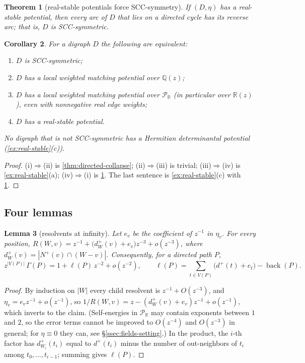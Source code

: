 \documentclass[11pt]{amsart}
\theoremstyle{plain}
\newtheorem{theorem}{Theorem}[section]
\newtheorem{lemma}[theorem]{Lemma}
\newtheorem{corollary}[theorem]{Corollary}
\theoremstyle{definition}
\theoremstyle{remark}
\numberwithin{equation}{section}
\newcommand{\QQ}{\mathbb{Q}}
\newcommand{\RR}{\mathbb{R}}
\newcommand{\Qz}{\QQ(z)}
\newcommand{\Rz}{\RR(z)}
\newcommand{\Puis}{\mathcal{P}_{\RR}}
\newcommand{\back}{\operatorname{back}}
\newcommand{\nplus}{N^{+}}
\begin{document}
\begin{theorem}[real-stable potentials force SCC-symmetry]\label{thm:main-real}
If $(D,\eta)$ has a real-stable potential, then every arc of $D$ that lies on a directed cycle has its reverse arc; that is, $D$ is SCC-symmetric.
\end{theorem}

\begin{corollary}\label{cor:characterization}
For a digraph $D$ the following are equivalent:
\begin{enumerate}[label=\textup{(\roman*)}]
\item $D$ is SCC-symmetric;
\item $D$ has a local weighted matching potential over $\Qz$;
\item $D$ has a local weighted matching potential over $\Puis$ \textup{(}in particular over $\Rz$\textup{)}, even with nonnegative real edge weights;
\item $D$ has a real-stable potential.
\end{enumerate}
No digraph that is not SCC-symmetric has a Hermitian determinantal potential \textup{(}\cref{ex:real-stable}\textup{(c))}.
\end{corollary}
\begin{proof}
(i)$\Rightarrow$(ii) is \cref{thm:directed-collapse}; (ii)$\Rightarrow$(iii) is trivial; (iii)$\Rightarrow$(iv) is \cref{ex:real-stable}(a); (iv)$\Rightarrow$(i) is \cref{thm:main-real}. The last sentence is \cref{ex:real-stable}(c) with \cref{thm:main-real}.
\end{proof}

\subsection{Four lemmas}

\begin{lemma}[resolvents at infinity]\label{lem:asymptotics}
Let $e_v$ be the coefficient of $z^{-1}$ in $\eta_v$. For every position, $R(W,v)=z^{-1}+\bigl(d^{+}_W(v)+e_v\bigr)z^{-3}+o(z^{-3})$, where $d^{+}_W(v)=|\nplus(v)\cap(W-v)|$. Consequently, for a directed path $P$,
\[
z^{|V(P)|}\,\Gamma(P)=1+\ell(P)\,z^{-2}+o(z^{-2}),\qquad \ell(P)=\sum_{t\in V(P)}\bigl(d^{+}(t)+e_t\bigr)-\back(P).
\]
\end{lemma}
\begin{proof}
By induction on $|W|$ every child resolvent is $z^{-1}+O(z^{-3})$, and $\eta_v=e_vz^{-1}+o(z^{-1})$, so $1/R(W,v)=z-(d^{+}_W(v)+e_v)z^{-1}+o(z^{-1})$, which inverts to the claim. (Self-energies in $\Puis$ may contain exponents between $1$ and $2$, so the error terms cannot be improved to $O(z^{-4})$ and $O(z^{-3})$ in general; for $\eta\equiv0$ they can, see \S\ref{ssec:fields-setting}.) In the product, the $i$-th factor has $d^{+}_{W_i}(t_i)$ equal to $d^{+}(t_i)$ minus the number of out-neighbors of $t_i$ among $t_0,\dots,t_{i-1}$; summing gives $\ell(P)$.
\end{proof}
\end{document}
